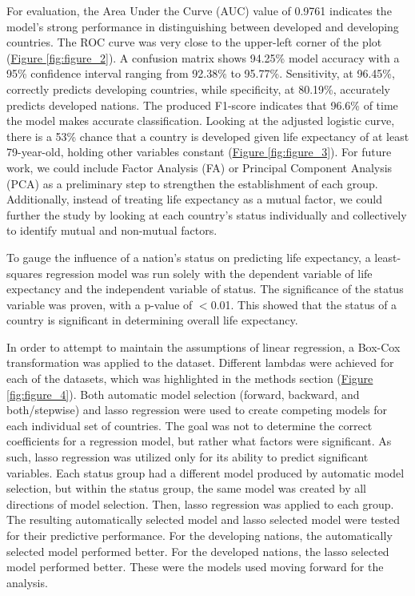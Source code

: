 \documentclass[12pt]{article}
\begin{document}
\begin{multicols}{2}
For evaluation, the Area Under the Curve (AUC) value of 0.9761 indicates the model's strong performance in distinguishing between developed and developing countries. The ROC curve was very close to the upper-left corner of the plot (\hyperref[fig:figure_2]{Figure \ref{fig:figure_2}}). A confusion matrix shows 94.25\% model accuracy with a 95\% confidence interval ranging from 92.38\% to 95.77\%. Sensitivity, at 96.45\%, correctly predicts developing countries, while specificity, at 80.19\%, accurately predicts developed nations. The produced F1-score indicates that 96.6\% of time the model makes accurate classification. Looking at the adjusted logistic curve, there is a 53\% chance that a country is developed given life expectancy of at least 79-year-old, holding other variables constant (\hyperref[fig:figure_3]{Figure \ref{fig:figure_3}}). For future work, we could include Factor Analysis (FA) or Principal Component Analysis (PCA) as a preliminary step to strengthen the establishment of each group. Additionally, instead of treating life expectancy as a mutual factor, we could further the study by looking at each country's status individually and collectively to identify mutual and non-mutual factors.

To gauge the influence of a nation's status on predicting life expectancy,  a least-squares regression model was run solely with the dependent variable of life expectancy and the independent variable of status. The significance of the status variable was proven, with a p-value of $<$0.01. This showed that the status of a country is significant in determining overall life expectancy. 

In order to attempt to maintain the assumptions of linear regression, a Box-Cox transformation was applied to the dataset. Different lambdas were achieved for each of the datasets, which was highlighted in the methods section (\hyperref[fig:figure_4]{Figure \ref{fig:figure_4}}). Both automatic model selection (forward, backward, and both/stepwise) and lasso regression were used to create competing models for each individual set of countries. The goal was not to determine the correct coefficients for a regression model, but rather what factors were significant. As such, lasso regression was utilized only for its ability to predict significant variables. Each status group had a different model produced by automatic model selection, but within the status group, the same model was created by all directions of model selection. Then, lasso regression was applied to each group. The resulting automatically selected model and lasso selected model were tested for their predictive performance. For the developing nations, the automatically selected model performed better. For the developed nations, the lasso selected model performed better. These were the models used moving forward for the analysis.


\end{multicols}
\end{document}
